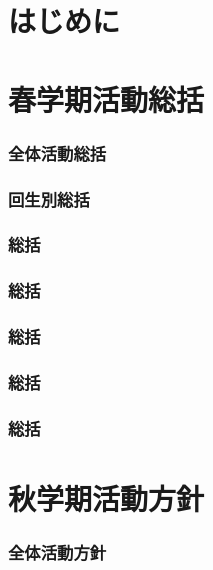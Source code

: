 \part*{はじめに}


\newpage
\part{春学期活動総括}
\section{全体活動総括}


\section{回生別総括}





\section{\kaikeiDepartment{}総括}

\section{\kensuiDepartment{}総括}

\section{\syogaiDepartment{}総括}

\section{\systemDepartment{}総括}

\section{\soumuDepartment{}総括}


\newpage
\part{秋学期活動方針}
\section{全体活動方針}


